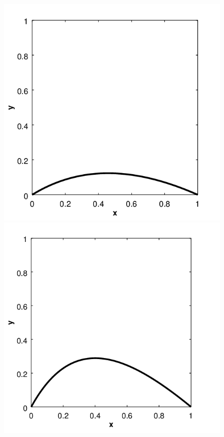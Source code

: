 \begin{enumerate}
\begin{itemize}
\begin{figure}[ht!]
  \centering
  \includegraphics[scale = 0.5]{eps_1.png}
  \includegraphics[scale = 0.5]{eps_2.png}

\end{figure}
\end{itemize}
\end{enumerate}

